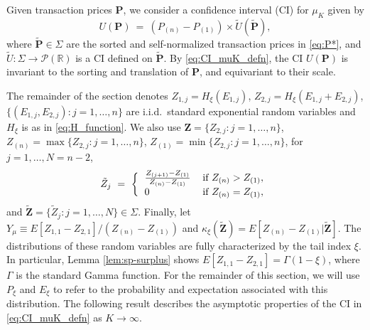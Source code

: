 Given transaction prices $\mathbf{P}$, we consider a confidence interval (CI) for $\mu _{K}$ given by
\begin{equation}
U(\mathbf{P})~= ~( P_{(n)}-P_{(1)}) \times \tilde{U}(\mathbf{\tilde{P }}), \label{eq:CI_muK_defn}
\end{equation}
where $\mathbf{\tilde{P}}\in \Sigma $ are the sorted and self-normalized transaction prices in \eqref{eq:P*}, and $\tilde{U}:\Sigma\to \mathcal{P}(\mathbb{R})$ is a CI defined on $\mathbf{\tilde{P}}$. By \eqref{eq:CI_muK_defn}, the CI $U(\mathbf{P})$ is invariant to the sorting and translation of $\mathbf{P}$, and equivariant to their scale.

The remainder of the section denotes $ Z_{1,j}=H_{\xi }(E_{1,j})$, $Z_{2,j}=H_{\xi }(E_{1,j}+E_{2,j})$, $ \{(E_{1,j},E_{2,j}):j=1,\dots ,n\}$ are i.i.d.\ standard exponential random variables and $H_{\xi }$ is as in \eqref{eq:H_function}. We also use $ \mathbf{Z}=\{Z_{2,j}:j=1,\dots ,n\}$, $Z_{(n)}=\max \{Z_{2,j}:j=1,\dots ,n\}$, $Z_{(1)}=\min \{Z_{2,j}:j=1,\dots ,n\}$, for $j=1,\ldots ,N=n-2$,
\begin{equation}
\tilde{Z}_{j}~=~\bigg\{
\begin{tabular}{ll}
$\frac{Z_{( j+1) }-Z_{(1)}}{Z_{(n)}-Z_{(1)}}$ & if $ Z_{(n)}>Z_{(1)},$ \\
$0$ & if $Z_{(n)}=Z_{(1)},$
\end{tabular}
\label{eq:ZsortedScaled}
\end{equation}
and $\mathbf{\tilde{Z}}=\{\tilde{Z}_{j}:j=1,\dots ,N\} \in \Sigma$. Finally, let $Y_{\mu }\equiv E[Z_{1,1}-Z_{2,1}]/(Z_{(n)}-Z_{(1)})$ and $\kappa _{\xi }(\mathbf{\tilde{Z}} )=E[Z_{(n)}-Z_{(1)}|\mathbf{\tilde{Z}}]$. The distributions of these random variables are fully characterized by the tail index $\xi $. 
In particular, Lemma \ref{lem:sp-surplus} shows $ E[Z_{1,1}-Z_{2,1}] = \Gamma(1-\xi)$, where $\Gamma$ is the standard Gamma function. 
For the remainder of this section, we will use $P_{\xi}$ and $E_{\xi}$ to refer to the probability and expectation associated with this distribution.
The following result describes the asymptotic properties of the CI in \eqref{eq:CI_muK_defn} as $K\to \infty$. 

